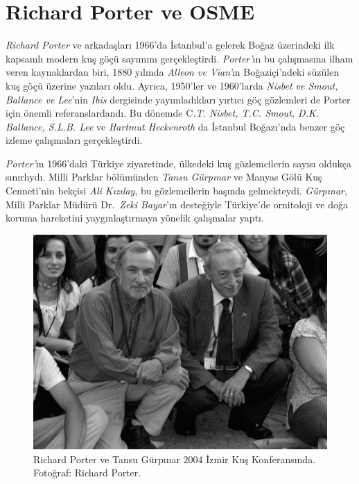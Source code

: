 \documentclass[
  a4paper,
  DIV=11,
  numbers=noendperiod]{scrartcl}
\begin{document}
\section*{Richard Porter ve OSME}\label{richard-porter-ve-osme}


\emph{Richard Porter} ve arkadaşları 1966'da İstanbul'a gelerek Boğaz
üzerindeki ilk kapsamlı modern kuş göçü sayımını gerçekleştirdi.
\emph{Porter'}ın bu çalışmasına ilham veren kaynaklardan biri, 1880
yılında \emph{Alleon ve Vian'}ın Boğaziçi'ndeki süzülen kuş göçü üzerine
yazıları oldu. Ayrıca, 1950'ler ve 1960'larda \emph{Nisbet ve Smout,}
\emph{Ballance ve Lee}'nin \emph{Ibis} dergisinde yayımladıkları yırtıcı
göç gözlemleri de Porter için önemli referanslardandı. Bu dönemde
C\emph{.T. Nisbet, T.C. Smout, D.K. Ballance, S.L.B. Lee} ve
\emph{Hartmut Heckenroth} da İstanbul Boğazı'nda benzer göç izleme
çalışmaları gerçekleştirdi.

\emph{Porter'}ın 1966'daki Türkiye ziyaretinde, ülkedeki kuş
gözlemcilerin sayısı oldukça sınırlıydı. Milli Parklar bölümünden
\emph{Tansu Gürpınar} ve Manyas Gölü Kuş Cenneti'nin bekçisi \emph{Ali
Kızılay}, bu gözlemcilerin başında gelmekteydi. \emph{Gürpınar}, Milli
Parklar Müdürü Dr.~\emph{Zeki Bayar}'ın desteğiyle Türkiye'de ornitoloji
ve doğa koruma hareketini yaygınlaştırmaya yönelik çalışmalar yaptı.

\begin{figure}[H]

{\centering \includegraphics{images/richard_tansu.gif}

}

\caption{Richard Porter ve Tansu Gürpınar 2004 İzmir Kuş Konferansında.
Fotoğraf: Richard Porter.}

\end{figure}%
\end{document}
